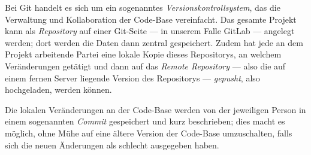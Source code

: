 \documentclass[a4paper,12pt]{article}
\begin{document}
Bei Git handelt es sich um ein sogenanntes \textit{Versionskontrollsystem}, das die Verwaltung und Kollaboration der Code-Base vereinfacht. 
Das gesamte Projekt kann als \textit{Repository} auf einer Git-Seite — in unserem Falle GitLab — angelegt werden; dort werden die Daten dann zentral gespeichert.
Zudem hat jede an dem Projekt arbeitende Partei eine lokale Kopie dieses Repositorys, an welchem Veränderungen getätigt und dann auf das \textit{Remote Repository} — also die auf einem fernen Server liegende Version des Repositorys — \textit{gepusht}, also hochgeladen, werden können.

Die lokalen Veränderungen an der Code-Base werden von der jeweiligen Person in einem sogenannten \textit{Commit} gespeichert und kurz beschrieben; dies macht es möglich, ohne Mühe auf eine ältere Version der Code-Base umzuschalten, falls sich die neuen Änderungen als schlecht ausgegeben haben.
\end{document}
